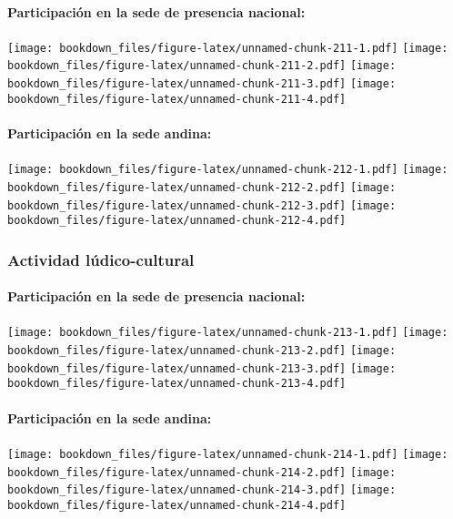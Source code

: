 \documentclass[]{article}
\let\oldparagraph\paragraph
\renewcommand{\paragraph}[1]{\oldparagraph{#1}\mbox{}}
\theoremstyle{definition}
\theoremstyle{definition}
\theoremstyle{definition}
\theoremstyle{remark}
\begin{document}
\paragraph{Participación en la sede de presencia
nacional:}\label{participacion-en-la-sede-de-presencia-nacional-22}

\texttt{[image: bookdown\_files/figure-latex/unnamed-chunk-211-1.pdf]}
\texttt{[image: bookdown\_files/figure-latex/unnamed-chunk-211-2.pdf]}
\texttt{[image: bookdown\_files/figure-latex/unnamed-chunk-211-3.pdf]}
\texttt{[image: bookdown\_files/figure-latex/unnamed-chunk-211-4.pdf]}

\paragraph{Participación en la sede
andina:}\label{participacion-en-la-sede-andina-22}

\texttt{[image: bookdown\_files/figure-latex/unnamed-chunk-212-1.pdf]}
\texttt{[image: bookdown\_files/figure-latex/unnamed-chunk-212-2.pdf]}
\texttt{[image: bookdown\_files/figure-latex/unnamed-chunk-212-3.pdf]}
\texttt{[image: bookdown\_files/figure-latex/unnamed-chunk-212-4.pdf]}

\subsubsection{Actividad
lúdico-cultural}\label{actividad-ludico-cultural-1}

\paragraph{Participación en la sede de presencia
nacional:}\label{participacion-en-la-sede-de-presencia-nacional-23}

\texttt{[image: bookdown\_files/figure-latex/unnamed-chunk-213-1.pdf]}
\texttt{[image: bookdown\_files/figure-latex/unnamed-chunk-213-2.pdf]}
\texttt{[image: bookdown\_files/figure-latex/unnamed-chunk-213-3.pdf]}
\texttt{[image: bookdown\_files/figure-latex/unnamed-chunk-213-4.pdf]}

\paragraph{Participación en la sede
andina:}\label{participacion-en-la-sede-andina-23}

\texttt{[image: bookdown\_files/figure-latex/unnamed-chunk-214-1.pdf]}
\texttt{[image: bookdown\_files/figure-latex/unnamed-chunk-214-2.pdf]}
\texttt{[image: bookdown\_files/figure-latex/unnamed-chunk-214-3.pdf]}
\texttt{[image: bookdown\_files/figure-latex/unnamed-chunk-214-4.pdf]}
\end{document}
